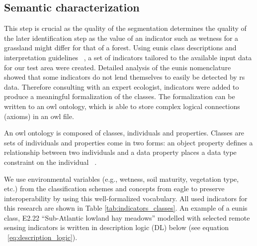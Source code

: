 \documentclass[authoryear,review,12pt,number]{elsarticle}
\begin{document}
\subsection{Semantic characterization}
\label{subsec:reference_data_and_semantic_characterisation} 
 This step is
crucial as the quality of the segmentation determines the quality of the later
identification step as the value of an indicator such as wetness for a grassland
might differ for that of a forest. Using \gls{eunis} class descriptions and
interpretation guidelines ~\citep{EUNISManual}, a set of indicators 
tailored to
the available input data for our test area were created. Detailed analysis of
the \gls{eunis} nomenclature showed that some indicators do not lend themselves 
to
easily be detected by \gls{rs} data. Therefore consulting with an expert 
ecologist,
indicators were added to produce a meaningful formalization of the classes. The
formalization can be written to an \gls{owl} ontology, which is able to store 
complex
logical connections (axioms) in an \gls{owl} file.

An \gls{owl} ontology is composed of classes, individuals and 
properties. Classes are
sets of individuals and properties come in two forms: an object property defines
a relationship between two individuals and a data property  places a data type
constraint on the individual ~\citep{OWL2}. 

We use environmental variables (e.g., wetness, soil maturity, vegetation type,
etc.) from the classification schemes and concepts from \gls{eagle} to preserve
interoperability by using this well-formalized vocabulary. All used indicators
for this research are shown in Table \ref{tab:indicators_classes}. An example of
a \gls{eunis} class, E2.22 ``Sub-Atlantic lowland hay meadows'' modelled with 
selected
remote sensing indicators is written in description logic (DL) below (see
equation ~\ref{eq:description_logic}).
\end{document}
